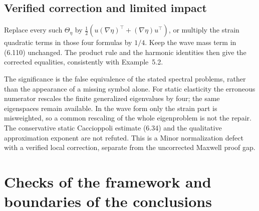 \documentclass[10pt]{article}
\begin{document}
\subsection*{Verified correction and limited impact}
Replace every such \(\Theta_\eta\) by \(\tfrac12(u(\nabla\eta)^\top+(\nabla\eta)u^\top)\), or multiply the strain quadratic terms in those four formulas by \(1/4\). Keep the wave mass term in (6.110) unchanged. The product rule and the harmonic identities then give the corrected equalities, consistently with Example 5.2.\par
The significance is the false equivalence of the stated spectral problems, rather than the appearance of a missing symbol alone. For static elasticity the erroneous numerator rescales the finite generalized eigenvalues by four; the same eigenspaces remain available. In the wave form only the strain part is misweighted, so a common rescaling of the whole eigenproblem is not the repair. The conservative static Caccioppoli estimate (6.34) and the qualitative approximation exponent are not refuted. This is a Minor normalization defect with a verified local correction, separate from the uncorrected Maxwell proof gap.\par
\section*{Checks of the framework and boundaries of the conclusions}
\end{document}

